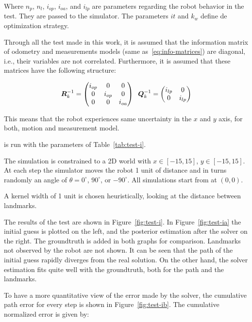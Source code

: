 Where $n_p$, $n_l$, $i_{op}$, $i_{oa}$, and $i_{lp}$ are parameters regarding the robot behavior in the test. They are passed to the simulator. The parameters $it$ and $k_w$ define de optimization strategy.

Through all the test made in this work, it is assumed that the information matrix of odometry and measurements models (same as~\eqref{eq:info-matrices}) are diagonal, i.e., their variables are not correlated. Furthermore, it is assumed that these matrices have the following structure:

\begin{equation}
\boldsymbol{R}^{-1}_k = \begin{pmatrix}
i_{op} & 0 & 0\\
0 & i_{op} & 0\\
0 & 0 & i_{oa}
\end{pmatrix} \;\;
\boldsymbol{Q}^{-1}_k = \begin{pmatrix}
i_{lp} & 0\\
0 & i_{lp}
\end{pmatrix} 
\label{eq:info-matrices-tests}
\end{equation}

This means that the robot experiences same uncertainty in the $x$ and $y$ axis, for both, motion and measurement model. 

 is run with the parameters of Table~\ref{tab:test-i}. 

The simulation is constrained to a 2D world with $x\in[-15,15]$, $y\in[-15,15]$. At each step the simulator moves the robot 1 unit of distance and in turns randomly an angle of $\theta=0^\circ$, $90^\circ$, or $-90^\circ$. All simulations start from at $(0,0)$.

A kernel width of 1 unit is chosen heuristically, looking at the distance between landmarks. 

The results of the test are shown in Figure~\ref{fig:test-i}. In Figure~\ref{fig:test-ia} the initial guess is plotted on the left, and the posterior estimation after the solver on the right. The groundtruth is added in both graphs for comparison. Landmarks not observed by the robot are not shown.  It can be seen that the path of the initial guess rapidly diverges from the real solution. On the other hand, the solver estimation fits quite well with the groundtruth, both for the path and the landmarks.

To have a more quantitative view of the error made by the solver, the cumulative path error for every step is shown in Figure~\ref{fig:test-ib}.  The cumulative normalized error is given by:

